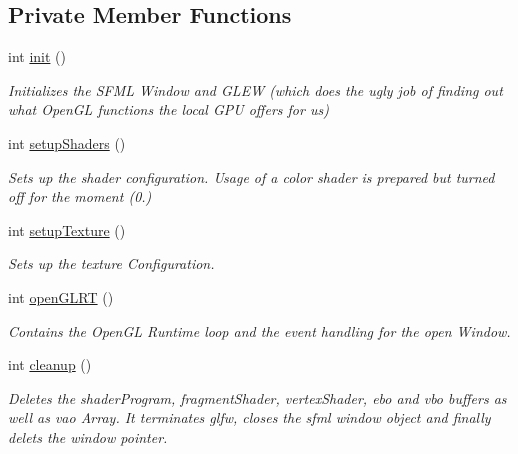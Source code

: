 \subsection*{Private Member Functions}
\begin{DoxyCompactItemize}
\item 
int \mbox{\hyperlink{classOpenGLWrapper_af99a93ae1e6a5ed7b1422b4838065e42}{init}} ()
\begin{DoxyCompactList}\small\item\em Initializes the S\+F\+ML Window and G\+L\+EW (which does the ugly job of finding out what Open\+GL functions the local G\+PU offers for us) \end{DoxyCompactList}\item 
int \mbox{\hyperlink{classOpenGLWrapper_a122d3908139936926442385921967157}{setup\+Shaders}} ()
\begin{DoxyCompactList}\small\item\em Sets up the shader configuration. Usage of a color shader is prepared but turned off for the moment (0.) \end{DoxyCompactList}\item 
int \mbox{\hyperlink{classOpenGLWrapper_a9f2ce92894cb84914b73349c88bb6fef}{setup\+Texture}} ()
\begin{DoxyCompactList}\small\item\em Sets up the texture Configuration. \end{DoxyCompactList}\item 
int \mbox{\hyperlink{classOpenGLWrapper_adfbe0218cff4daa4eb39cc6b53f7717f}{open\+G\+L\+RT}} ()
\begin{DoxyCompactList}\small\item\em Contains the Open\+GL Runtime loop and the event handling for the open Window. \end{DoxyCompactList}\item 
int \mbox{\hyperlink{classOpenGLWrapper_a0c878818b04f78dd90e44dfed481ccab}{cleanup}} ()
\begin{DoxyCompactList}\small\item\em Deletes the shader\+Program, fragment\+Shader, vertex\+Shader, ebo and vbo buffers as well as vao Array. It terminates glfw, closes the sfml window object and finally delets the window pointer. \end{DoxyCompactList}\end{DoxyCompactItemize}
